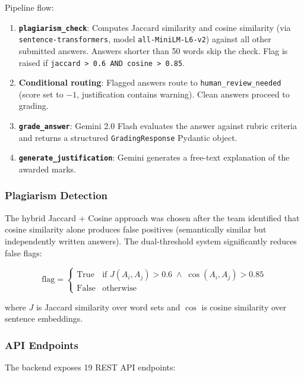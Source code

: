 \documentclass[12pt,a4paper]{article}
\begin{document}
Pipeline flow:
\begin{enumerate}[noitemsep]
  \item \textbf{\texttt{plagiarism\_check}}: Computes Jaccard similarity and cosine similarity (via \texttt{sentence-transformers}, model \texttt{all-MiniLM-L6-v2}) against all other submitted answers. Answers shorter than 50 words skip the check. Flag is raised if \texttt{jaccard > 0.6 AND cosine > 0.85}.
  \item \textbf{Conditional routing}: Flagged answers route to \texttt{human\_review\_needed} (score set to $-1$, justification contains warning). Clean answers proceed to grading.
  \item \textbf{\texttt{grade\_answer}}: Gemini 2.0 Flash evaluates the answer against rubric criteria and returns a structured \texttt{GradingResponse} Pydantic object.
  \item \textbf{\texttt{generate\_justification}}: Gemini generates a free-text explanation of the awarded marks.
\end{enumerate}

\subsubsection{Plagiarism Detection}

The hybrid Jaccard + Cosine approach was chosen after the team identified that cosine similarity alone produces false positives (semantically similar but independently written answers). The dual-threshold system significantly reduces false flags:

\begin{equation}
\text{flag} = \begin{cases} \text{True} & \text{if } J(A_i, A_j) > 0.6 \;\land\; \cos(A_i, A_j) > 0.85 \\ \text{False} & \text{otherwise} \end{cases}
\end{equation}

where $J$ is Jaccard similarity over word sets and $\cos$ is cosine similarity over sentence embeddings.

\subsubsection{API Endpoints}

The backend exposes 19 REST API endpoints:
\end{document}
